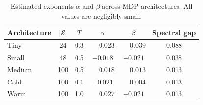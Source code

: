 \begin{table}[ht]
\centering
\caption{Estimated exponents $\alpha$ and $\beta$ across MDP architectures.
  All values are negligibly small.}\label{tab:architecture}
\begin{tabular}{@{}lccccc@{}}
\toprule
Architecture & $|\mathcal{S}|$ & $T$ & $\alpha$ & $\beta$ &
  Spectral gap \\
\midrule
Tiny   &  24 & 0.3 & $\phantom{-}0.023$ & $\phantom{-}0.039$ & 0.088 \\
Small  &  48 & 0.5 & $-0.018$            & $-0.021$            & 0.038 \\
Medium & 100 & 0.5 & $\phantom{-}0.018$  & $\phantom{-}0.013$ & 0.013 \\
Cold   & 100 & 0.1 & $-0.021$            & $\phantom{-}0.004$ & 0.013 \\
Warm   & 100 & 1.0 & $\phantom{-}0.027$  & $-0.021$            & 0.013 \\
\bottomrule
\end{tabular}
\end{table}
